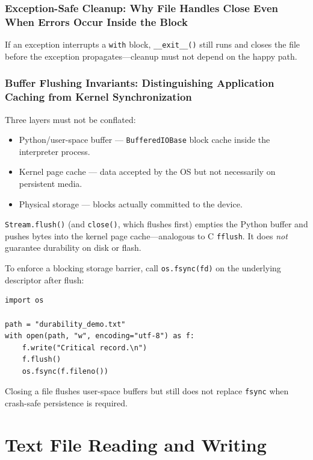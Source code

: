 \documentclass[a4paper,twoside]{report}
\begin{document}
\subsubsection{Exception-Safe Cleanup: Why File Handles Close Even When Errors Occur Inside the Block}

If an exception interrupts a \texttt{with} block, \texttt{\_\_exit\_\_()} still runs and closes the file before the exception propagates---cleanup must not depend on the happy path.

\subsubsection{Buffer Flushing Invariants: Distinguishing Application Caching from Kernel Synchronization}

Three layers must not be conflated:

\begin{itemize}
    \item Python/user-space buffer --- \texttt{BufferedIOBase} block cache inside the interpreter process.
    \item Kernel page cache --- data accepted by the OS but not necessarily on persistent media.
    \item Physical storage --- blocks actually committed to the device.
\end{itemize}

\texttt{Stream.flush()} (and \texttt{close()}, which flushes first) empties the Python buffer and pushes bytes into the kernel page cache---analogous to C \texttt{fflush}. It does \emph{not} guarantee durability on disk or flash.

To enforce a blocking storage barrier, call \texttt{os.fsync(fd)} on the underlying descriptor after flush:

\begin{verbatim}
import os

path = "durability_demo.txt"
with open(path, "w", encoding="utf-8") as f:
    f.write("Critical record.\n")
    f.flush()
    os.fsync(f.fileno())
\end{verbatim}

Closing a file flushes user-space buffers but still does not replace \texttt{fsync} when crash-safe persistence is required.


\section{Text File Reading and Writing}
\end{document}
